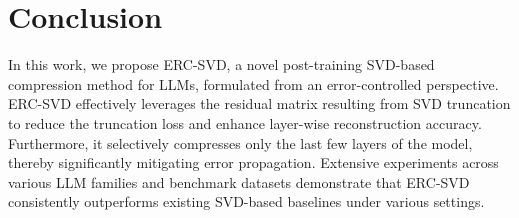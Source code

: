 \section{Conclusion}\label{conclusion}
In this work, we propose ERC-SVD, a novel post-training SVD-based compression method for LLMs, formulated from an error-controlled perspective. 
ERC-SVD effectively leverages the residual matrix resulting from SVD truncation to reduce the truncation loss and enhance layer-wise reconstruction accuracy. 
Furthermore, it selectively compresses only the last few layers of the model, thereby significantly mitigating error propagation.
Extensive experiments across various LLM families and benchmark datasets demonstrate that ERC-SVD consistently outperforms existing SVD-based baselines under various settings.
